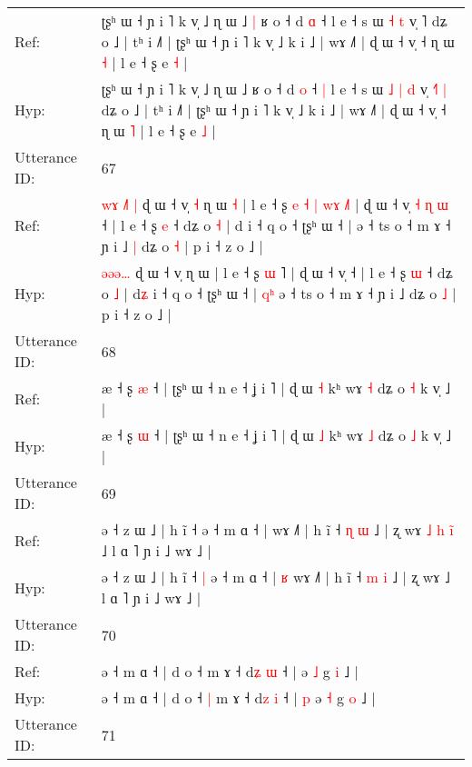\documentclass[10pt]{article}
\DeclareRobustCommand{\hl}[1]{{\textcolor{red}{#1}}}
\begin{document}
\begin{longtable}{ll}
Ref: & ʈʂʰ ɯ ˧ ɲ i ˥ k v̩ ˩ ɳ ɯ ˩\hl{ }\hl{|} ʁ o ˧ d \hl{ɑ} ˧\hl{}\hl{} l e ˧ s ɯ\hl{}\hl{} \hl{˧} \hl{t} v̩ \hl{}˥\hl{}\hl{} dʑ o ˩ | tʰ i ˩˥ | ʈʂʰ ɯ ˧ ɲ i ˥ k v̩ ˩ k i ˩ | wɤ ˩˥ | ɖ ɯ ˧ v̩ ˧ ɳ ɯ \hl{˧} | l e ˧ ʂ e \hl{˧} |
 \\
Hyp: & ʈʂʰ ɯ ˧ ɲ i ˥ k v̩ ˩ ɳ ɯ ˩\hl{}\hl{} ʁ o ˧ d \hl{o} ˧\hl{ }\hl{|} l e ˧ s ɯ\hl{ }\hl{˩} \hl{|} \hl{d} v̩ \hl{˧}˥\hl{ }\hl{|} dʑ o ˩ | tʰ i ˩˥ | ʈʂʰ ɯ ˧ ɲ i ˥ k v̩ ˩ k i ˩ | wɤ ˩˥ | ɖ ɯ ˧ v̩ ˧ ɳ ɯ \hl{˥} | l e ˧ ʂ e \hl{˩} |
 \\
\midrule
Utterance ID: & 67 \\
Ref: & \hl{w}\hl{ɤ}\hl{ }\hl{˩}\hl{˥}\hl{ }\hl{|} ɖ ɯ ˧ v̩\hl{ }\hl{˧} ɳ ɯ\hl{ }\hl{˧} | l e ˧ ʂ\hl{ }\hl{e}\hl{ }\hl{˧}\hl{ }\hl{|} \hl{w}\hl{ɤ} \hl{˩}˥ | ɖ ɯ ˧ v̩\hl{ }\hl{˧}\hl{ }\hl{ɳ}\hl{ }\hl{ɯ} ˧ | l e ˧ ʂ \hl{e} ˧ dʑ o \hl{˧} | d\hl{} i ˧ q o ˧ ʈʂʰ ɯ ˧ |\hl{}\hl{}\hl{} ə ˧ ts o ˧ m ɤ ˧ ɲ i ˩\hl{ }\hl{|} dʑ o \hl{˧} | p i ˧ z o ˩ |
 \\
Hyp: & \hl{}\hl{}\hl{}\hl{ə}\hl{ə}\hl{ə}\hl{…} ɖ ɯ ˧ v̩\hl{}\hl{} ɳ ɯ\hl{}\hl{} | l e ˧ ʂ\hl{}\hl{}\hl{}\hl{}\hl{}\hl{} \hl{}\hl{ɯ} \hl{}˥ | ɖ ɯ ˧ v̩\hl{}\hl{}\hl{}\hl{}\hl{}\hl{} ˧ | l e ˧ ʂ \hl{ɯ} ˧ dʑ o \hl{˩} | d\hl{ʑ} i ˧ q o ˧ ʈʂʰ ɯ ˧ |\hl{ }\hl{q}\hl{ʰ} ə ˧ ts o ˧ m ɤ ˧ ɲ i ˩\hl{}\hl{} dʑ o \hl{˩} | p i ˧ z o ˩ |
 \\
\midrule
Utterance ID: & 68 \\
Ref: & æ ˧ ʂ \hl{æ} ˧ | ʈʂʰ ɯ ˧ n e ˧ ʝ i ˥ | ɖ ɯ \hl{˧} kʰ wɤ \hl{˧} dʑ o \hl{˧} k v̩ ˩ |
 \\
Hyp: & æ ˧ ʂ \hl{ɯ} ˧ | ʈʂʰ ɯ ˧ n e ˧ ʝ i ˥ | ɖ ɯ \hl{˩} kʰ wɤ \hl{˩} dʑ o \hl{˩} k v̩ ˩ |
 \\
\midrule
Utterance ID: & 69 \\
Ref: & ə ˧ z ɯ ˩ | h ĩ ˧\hl{}\hl{} ə ˧ m ɑ ˧ |\hl{}\hl{} wɤ ˩˥ | h ĩ ˧ \hl{ɳ} \hl{ɯ} ˩ | ʐ wɤ\hl{ }\hl{˩}\hl{ }\hl{h}\hl{ }\hl{i}\hl{̃} ˩ l ɑ ˥ ɲ i ˩ wɤ ˩ |
 \\
Hyp: & ə ˧ z ɯ ˩ | h ĩ ˧\hl{ }\hl{|} ə ˧ m ɑ ˧ |\hl{ }\hl{ʁ} wɤ ˩˥ | h ĩ ˧ \hl{m} \hl{i} ˩ | ʐ wɤ\hl{}\hl{}\hl{}\hl{}\hl{}\hl{}\hl{} ˩ l ɑ ˥ ɲ i ˩ wɤ ˩ |
 \\
\midrule
Utterance ID: & 70 \\
Ref: & ə ˧ m ɑ ˧ | d o ˧\hl{}\hl{} m ɤ ˧ d\hl{ʑ} \hl{ɯ} ˧ |\hl{}\hl{} ə \hl{˩} g \hl{i} ˩ |
 \\
Hyp: & ə ˧ m ɑ ˧ | d o ˧\hl{ }\hl{|} m ɤ ˧ d\hl{z} \hl{i} ˧ |\hl{ }\hl{p} ə \hl{˧} g \hl{o} ˩ |
 \\
\midrule
Utterance ID: & 71 \\

\end{longtable}
\end{document}
